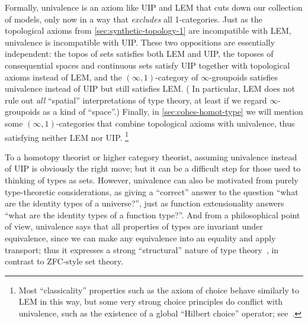 \documentclass[12pt]{article}
\def\oo{\ensuremath{\infty}}
\def\io{\ensuremath{(\oo,1)}}
\numberwithin{equation}{section}
\begin{document}
Formally, univalence is an axiom like UIP and LEM that cuts down our collection of models, only now in a way that \emph{excludes} all 1-categories.
Just as the topological axioms from \cref{sec:synthetic-topology-1} are incompatible with LEM, univalence is incompatible with UIP.
These two oppositions are essentially independent: the topos of sets satisfies both LEM and UIP, the toposes of consequential spaces and continuous sets satisfy UIP together with topological axioms instead of LEM, and the $\io$-category of $\oo$-groupoids satisfies univalence instead of UIP but still satisfies LEM.
(%
In particular, LEM does not rule out \emph{all} ``spatial'' interpretations of type theory, at least if we regard $\oo$-groupoids as a kind of ``space''.)
Finally, in \cref{sec:cohes-homot-type} we will mention some $\io$-categories that combine topological axioms with univalence, thus satisfying neither LEM nor UIP.%
\footnote{\label{fn:globalchoice}Most ``classicality'' properties such as the axiom of choice behave similarly to LEM in this way, but some very strong choice principles do conflict with univalence, such as the existence of a global ``Hilbert choice'' operator; see~\cite[\S3.2 and Exercise 3.11]{hottbook}.}

To a homotopy theorist or higher category theorist, assuming univalence instead of UIP is obviously the right move; but it can be a difficult step for those used to thinking of types as sets.
However, univalence can also be motivated from purely type-theoretic considerations, as giving a ``correct'' answer to the question ``what are the identity types of a universe?'', just as function extensionality answers ``what are the identity types of a function type?''.
And from a philosophical point of view, univalence says that all properties of types are invariant under equivalence, since we can make any equivalence into an equality and apply transport;
thus it expresses a strong ``structural'' nature of type theory~\cite{awodey:struc-invar-ua,corfield:structure-of-a}, in contrast to ZFC-style set theory.
\end{document}
